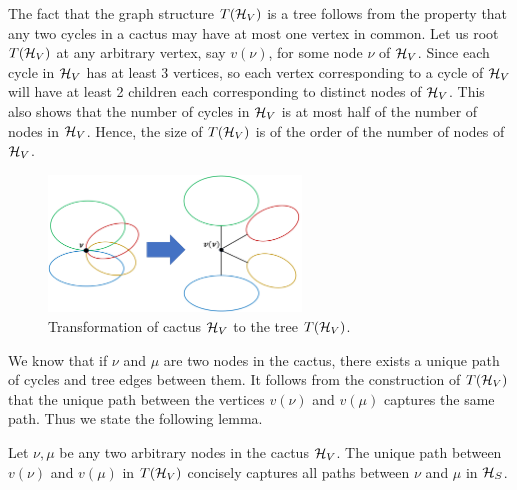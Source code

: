The fact that the graph structure $T({\cal H}_V)$ is a tree follows from the property that any two cycles in a cactus may have at most one vertex in common. Let us root $T({\cal H}_V)$ at any arbitrary vertex, say $v(\nu)$, for some node $\nu$ of ${\cal H}_V$. Since each cycle in ${\cal H}_V$ has at least 3 vertices, so each vertex corresponding to a cycle of ${\cal H}_V$ will have at least 2 children each corresponding to distinct nodes of ${\cal H}_V$. This also shows that the number of cycles in ${\cal H}_V$ is at most half of the number of nodes in ${\cal H}_V$. Hence, the size of $T({\cal H}_V)$ is of the order of the number of nodes of ${\cal H}_V$. 

\begin{figure}[H]
\centering
\includegraphics[width=0.6\textwidth]{src/images/Cactus-transformation.png}
    \caption{Transformation of cactus ${\cal H}_V$ to the tree $T({\cal H}_V)$.}
\label{fig:transform-cactus-to-tree}
\end{figure}

We know that if $\nu$ and $\mu$ are two nodes in the cactus, there exists a unique path of cycles and tree edges between them. It follows from the construction of $T({\cal H}_V)$ that the unique path between the vertices $v(\nu)$ and $v(\mu)$ captures the same path. Thus we state the following lemma.

\begin{lemma}
Let $\nu,\mu$ be any two arbitrary nodes in the cactus 
${\cal H}_V$. The unique path between $v(\nu)$ and $v(\mu)$ in $T({\cal H}_V)$ concisely captures all
paths between $\nu$ and $\mu$ in ${\cal H}_S$.
\label{lem:path-in-T(H_S)}
\end{lemma}

